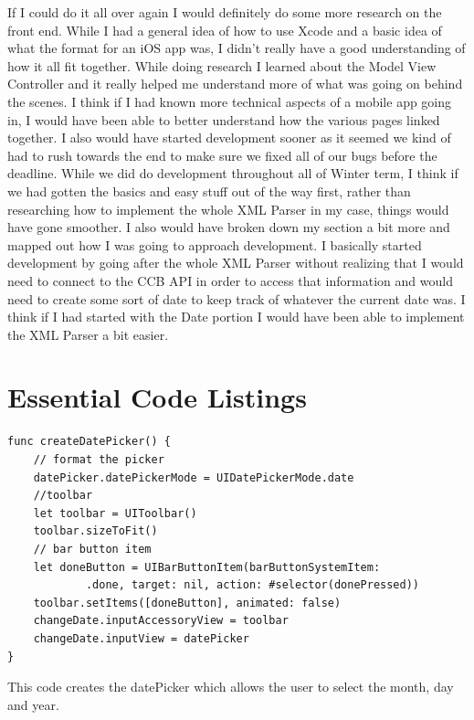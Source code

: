 \documentclass[letterpaper,10pt,draftclsnofoot,onecolumn,titlepage]{IEEEtran}
\begin{document}
		If I could do it all over again I would definitely do some more research on the front end.
		While I had a general idea of how to use Xcode and a basic idea of what the format for an iOS app was, I didn't really have a good understanding of how it all fit together.
		While doing research I learned about the Model View Controller and it really helped me understand more of what was going on behind the scenes.
		I think if I had known more technical aspects of a mobile app going in, I would have been able to better understand how the various pages linked together.
		I also would have started development sooner as it seemed we kind of had to rush towards the end to make sure we fixed all of our bugs before the deadline.
		While we did do development throughout all of Winter term, I think if we had gotten the basics and easy stuff out of the way first, rather than researching how to implement the whole XML Parser in my case, things would have gone smoother.
		I also would have broken down my section a bit more and mapped out how I was going to approach development.
		I basically started development by going after the whole XML Parser without realizing that I would need to connect to the CCB API in order to access that information and would need to create some sort of date to keep track of whatever the current date was.
		I think if I had started with the Date portion I would have been able to implement the XML Parser a bit easier. 

	
	

	\appendices

	\section{Essential Code Listings}

	\begin{lstlisting}[caption=iOS EventViewController Snippet]
func createDatePicker() {
    // format the picker
    datePicker.datePickerMode = UIDatePickerMode.date
    //toolbar
    let toolbar = UIToolbar()
    toolbar.sizeToFit()
    // bar button item
    let doneButton = UIBarButtonItem(barButtonSystemItem:
			.done, target: nil, action: #selector(donePressed))
    toolbar.setItems([doneButton], animated: false)
    changeDate.inputAccessoryView = toolbar
    changeDate.inputView = datePicker
}
\end{lstlisting}

This code creates the datePicker which allows the user to select the month, day and year.
\end{document}
